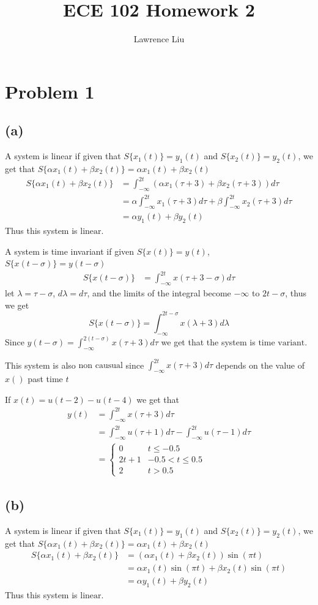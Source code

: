 \documentclass[12pt]{article}
\title{ECE 102 Homework 2}
\author{Lawrence Liu}
\begin{document}
\maketitle
\section*{Problem 1}
\subsection*{(a)}
A system is linear if given that $S\{x_1(t)\}=y_1(t)$ and $S\{x_2(t)\}=y_2(t)$, we get that $S\{\alpha x_1(t)+\beta x_2(t)\}=\alpha x_1(t) +\beta x_2(t)$
\begin{align*}
S\{\alpha x_1(t)+\beta x_2(t)\}&=\int_{-\infty}^{2t}(\alpha x_1(\tau+3)+\beta x_2(\tau+3))d\tau\\
&=\alpha\int_{-\infty}^{2t}x_1(\tau+3)d\tau+\beta\int_{-\infty}^{2t}x_2(\tau+3)d\tau\\
&=\alpha y_1(t)+\beta y_2(t)
\end{align*}
Thus this system is $\boxed{\text{linear}}$.

A system is time invariant if given $S\{x(t)\}=y(t)$, $S\{x(t-\sigma)\}=y(t-\sigma)$
\begin{align*}
S\{x(t-\sigma)\}&=\int_{-\infty}^{2t}x(\tau+3-\sigma)d\tau
\end{align*}
let $\lambda=\tau-\sigma$, $d\lambda=d\tau$, and the limits of the integral become $-\infty$ to $2t-\sigma$, thus we get
$$S\{x(t-\sigma)\}=\int_{-\infty}^{2t-\sigma}x(\lambda+3)d\lambda$$
Since $y(t-\sigma)=\int_{-\infty}^{2(t-\sigma)}x(\tau+3)d\tau$ we get that the system is $\boxed{\text{time variant}}$.

This system is also $\boxed{\text{non causual}}$ since $\int_{-\infty}^{2t}x(\tau+3)d\tau$ depends on the value of $x()$ past time $t$

If $x(t)=u(t-2)-u(t-4)$ we get that 
\begin{align*}
y(t)&=\int_{-\infty}^{2t}x(\tau+3)d\tau\\
&=\int_{-\infty}^{2t}u(\tau+1)d\tau-\int_{-\infty}^{2t}u(\tau-1)d\tau\\
&=\boxed{\begin{cases}
0 & t\leq-0.5\\
2t+1 & -0.5<t\leq0.5\\
2 & t>0.5
\end{cases}}
\end{align*}
\subsection*{(b)}
A system is linear if given that $S\{x_1(t)\}=y_1(t)$ and $S\{x_2(t)\}=y_2(t)$, we get that $S\{\alpha x_1(t)+\beta x_2(t)\}=\alpha x_1(t) +\beta x_2(t)$
\begin{align*}
S\{\alpha x_1(t)+\beta x_2(t)\}&=(\alpha x_1(t)+\beta x_2(t))\sin(\pi t)\\
&=\alpha x_1(t)\sin(\pi t)+\beta x_2(t)\sin(\pi t)\\
&=\alpha y_1(t)+\beta y_2(t)
\end{align*}
Thus this system is $\boxed{\text{linear}}$.
\end{document}
